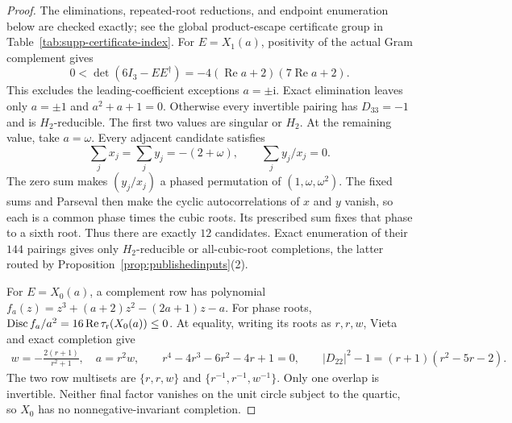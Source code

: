 \documentclass[aps,prx,reprint,nofootinbib,twoside,superscriptaddress,longbibliography,floatfix]{revtex4-2}
\theoremstyle{definition}
\newcommand{\I}{\mathrm i}
\newcommand{\RePart}{\operatorname{Re}}
\begin{document}
\begin{proof}
The eliminations, repeated-root reductions, and endpoint enumeration below are checked exactly; see the global product-escape certificate group in Table~\ref{tab:supp-certificate-index}.
{For $E=X_1(a)$, positivity of the actual Gram complement gives}
\begin{equation}
{0<\det(6I_3-EE^\dagger)=-4(\RePart a+2)(7\RePart a+2).}
\end{equation}
{This excludes the leading-coefficient exceptions $a=\pm\I$. Exact elimination leaves only $a=\pm1$ and $a^2+a+1=0$. Otherwise every invertible pairing has $D_{33}=-1$ and is $H_2$-reducible. The first two values are singular or $H_2$. At the remaining value, take $a=\omega$. Every adjacent candidate satisfies}
\begin{equation}
{\sum_jx_j=\sum_jy_j=-(2+\omega),
\qquad \sum_j y_j/x_j=0.}
\end{equation}
{The zero sum makes $(y_j/x_j)$ a phased permutation of $(1,\omega,\omega^2)$.  The fixed sums and Parseval then make the cyclic autocorrelations of $x$ and $y$ vanish, so each is a common phase times the cubic roots. Its prescribed sum fixes that phase to a sixth root.  Thus there are exactly $12$ candidates. Exact enumeration of their $144$ pairings gives only $H_2$-reducible or all-cubic-root completions, the latter routed by Proposition~\ref{prop:publishedinputs}(2).}

{For $E=X_0(a)$, a complement row has polynomial $f_a(z)=z^3+(a+2)z^2-(2a+1)z-a$.  For phase roots, $\operatorname{Disc}f_a/a^2=16\RePart\tau_{\rm r}(X_0(a))\le0$.  At equality, writing its roots as $r,r,w$, Vieta and exact completion give}
\begin{equation}
{\begin{gathered}
w=-\frac{2(r+1)}{r^2+1},\quad
a=r^2w,\qquad
r^4-4r^3-6r^2-4r+1=0,\qquad
|D_{22}|^2-1=(r+1)(r^2-5r-2).
\end{gathered}}
\end{equation}
{The two row multisets are $\{r,r,w\}$ and $\{r^{-1},r^{-1},w^{-1}\}$. Only one overlap is invertible. Neither final factor vanishes on the unit circle subject to the quartic, so $X_0$ has no nonnegative-invariant completion.}


\end{proof}
\end{document}
